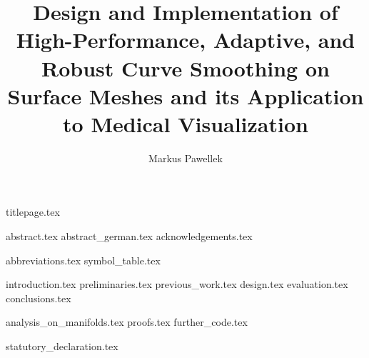 \documentclass[fleqn,10pt,twoside]{stdglobal}
\title{Design and Implementation of High-Performance, Adaptive, and Robust Curve Smoothing on Surface Meshes and its Application to Medical Visualization}
\author{Markus Pawellek}
\let\oldpagenumbering\pagenumbering
\renewcommand*\pagenumbering[1]{\cleardoublepage\oldpagenumbering{#1}}
\numberwithin{figure}{section}
\numberwithin{table}{section}
\begin{document}

  {titlepage.tex}

  {abstract.tex}
  \cleardoublepage
  {abstract_german.tex}
  {acknowledgements.tex}

  \tableofcontents
  \listoffigures
  \listoftables
  \listofmath
  {
    \small
    \listofcode
  }
  {abbreviations.tex}
  {symbol_table.tex}

  {introduction.tex}
  {preliminaries.tex}
  {previous_work.tex}
  {design.tex}
  {evaluation.tex}
  {conclusions.tex}

  \nocite{*}
  \printbibliography[heading=bibintoc]

  \appendix
  {analysis_on_manifolds.tex}
  {proofs.tex}
  {further_code.tex}

  {statutory_declaration.tex}
\end{document}
